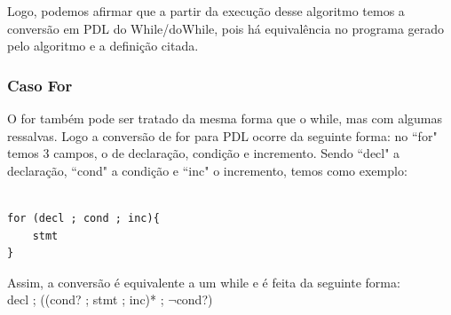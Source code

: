 \documentclass{article}
\begin{document}
	Logo, podemos afirmar que a partir da execução desse algoritmo temos a conversão em PDL do While/doWhile, pois há equivalência no programa gerado pelo algoritmo e a definição citada.
	\subsubsection{Caso For}
	
	O for também pode ser tratado da mesma forma que o while, mas com algumas ressalvas. Logo a conversão de for para PDL ocorre da seguinte forma: no ``for" temos 3 campos, o de declaração, condição e incremento. Sendo ``decl" a declaração, ``cond" a condição e ``inc" o incremento, temos como exemplo:\\
	
\begin{lstlisting}[frame=single]  % Start your code-block

for (decl ; cond ; inc){
	stmt
}

\end{lstlisting}

	
	Assim, a conversão é equivalente a um while e é feita da seguinte forma:\\
	\BlankLine	
	decl ; ((cond? ; stmt ; inc)* ; $\neg$cond?)\\
	\BlankLine
	
\end{document}

